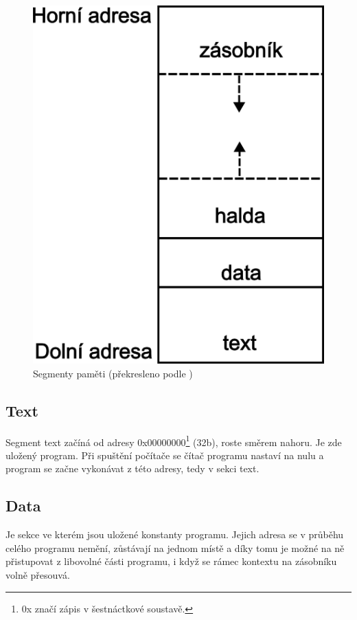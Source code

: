 \documentclass[FM,BP]{tulthesis}
\begin{document}
\begin{figure}[h]
    \includegraphics[scale=0.5]{assets/Stack.png}
    \centering
    \caption{Segmenty paměti (překresleno podle \cite{courses_Stack_and_Heap})}
    \label{img:StackAndHeap}
\end{figure}

\subsection{Text} \label{kap:Text}
Segment text začíná od adresy 0x00000000\footnote{0x značí zápis v šestnáctkové soustavě.} (32b), roste směrem nahoru. Je zde uložený program. Při spuštění počítače se čítač programu nastaví na nulu a program se začne vykonávat z této adresy, tedy v sekci text. 

\subsection{Data}
Je sekce ve kterém jsou uložené konstanty programu. Jejich adresa se v průběhu celého programu nemění, zůstávají na jednom místě a díky tomu je možné na ně přistupovat z libovolné části programu, i když se rámec kontextu na zásobníku volně přesouvá. 
\end{document}

